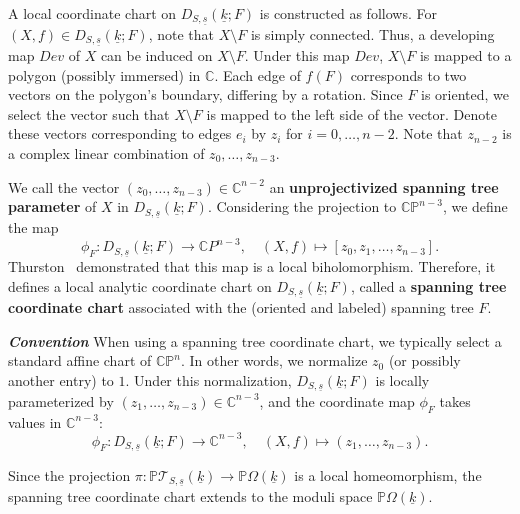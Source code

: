 \documentclass{compositio}
\numberwithin{equation}{section}
\numberwithin{figure}{section}
\theoremstyle{definition}
\theoremstyle{plain}
\begin{document}
{A local coordinate chart on $D_{S,\underline{s}}(\underline{k};F)$ is constructed as follows. For $(X,f) \in D_{S,\underline{s}}(\underline{k};F)$, note that $X \setminus F$ is simply connected. Thus, a developing map $Dev$ of $X$ can be induced on $X \setminus F$. Under this map $Dev$, $X \setminus F$ is mapped to a polygon (possibly immersed) in $\mathbb{C}$. Each edge of $f(F)$ corresponds to two vectors on the polygon’s boundary, differing by a rotation. Since $F$ is oriented, we select the vector such that $X \setminus F$ is mapped to the left side of the vector. Denote these vectors corresponding to edges $e_i$ by $z_i$ for $i = 0, \ldots, n-2$. Note that $z_{n-2}$ is a complex linear combination of $z_0, \ldots, z_{n-3}$. 

We call the vector $(z_0, \ldots, z_{n-3}) \in \mathbb{C}^{n-2}$ an \textbf{unprojectivized spanning tree parameter} of $X$ in $D_{S,\underline{s}}(\underline{k};F)$. 
Considering the projection to $\mathbb{CP}^{n-3}$, we define the map
\begin{equation}\label{equ:coordinatemap}
    \phi_F: D_{S,\underline{s}}(\underline{k};F) \to \mathbb{C}P^{n-3}, \quad (X, f) \mapsto [z_0, z_1, \ldots, z_{n-3}].
\end{equation}
Thurston~\cite{thu} demonstrated that this map is a local biholomorphism. Therefore, it defines a local analytic coordinate chart on $D_{S,\underline{s}}(\underline{k};F)$, called a \textbf{spanning tree coordinate chart} associated with the (oriented and labeled) spanning tree $F$. 

\smallskip

\noindent\textit{\textbf{Convention}} When using a spanning tree coordinate chart, we typically select a standard affine chart of $\mathbb{CP}^n$. In other words, we normalize $z_0$ (or possibly another entry) to $1$. Under this normalization, $D_{S,\underline{s}}(\underline{k};F)$ is locally parameterized by $(z_1, \ldots, z_{n-3}) \in \mathbb{C}^{n-3}$, and the coordinate map $\phi_F$ takes values in $\mathbb{C}^{n-3}$:
\begin{equation}\label{equ:coordinatemap2}
    \phi_F \colon D_{S,\underline{s}}(\underline{k};F) \to \mathbb{C}^{n-3}, \quad (X, f) \mapsto  (z_1, \ldots, z_{n-3}).
\end{equation}


Since the projection $\pi: \mathbb{P}\mathcal{T}_{S, \underline{s}}(\underline{k}) \to \mathbb{P}\Omega(\underline{k})$ is a local homeomorphism, the spanning tree coordinate chart extends to the moduli space $\mathbb{P}\Omega(\underline{k})$.

}
\end{document}

